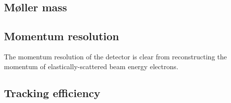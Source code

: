 


\subsection{M\o ller mass}

\subsection{Momentum resolution}
The momentum resolution of the detector is clear from reconstructing the momentum of elastically-scattered beam energy electrons. 


\subsection{Tracking efficiency}


